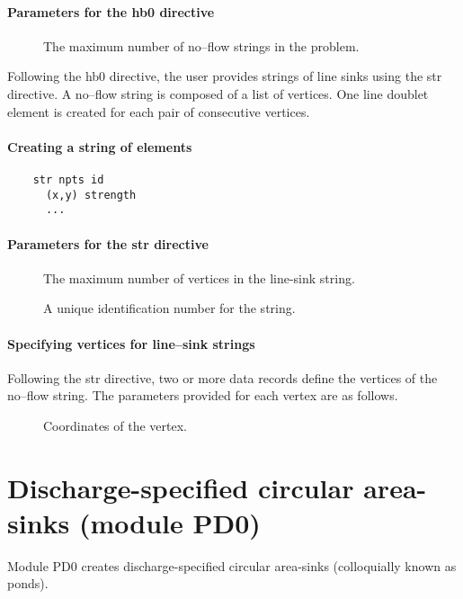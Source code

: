 \paragraph{Parameters for the \textsf{hb0} directive}
\begin{description}
\item [] The maximum number of no--flow strings in the
problem. \units{-}
\end{description}
Following the \textsf{hb0} directive, the user provides strings
of line sinks using the \textsf{str} directive. A no--flow string
is composed of a list of vertices. One line doublet element is created
for each pair of consecutive vertices.

\paragraph{Creating a string of elements}
\begin{verbatim}
    str npts id
      (x,y) strength
      ...
\end{verbatim}

\paragraph{Parameters for the str directive }
\begin{description}
  \item [] The maximum number of vertices in the line-sink
    string. \units{-}
  \item [] A unique identification number for the string. 
    \units{-}
\end{description}

\paragraph{Specifying vertices for line--sink strings}
Following the \textsf{str} directive, two or more data records define
the vertices of the no--flow string. The parameters provided for each
vertex are as follows.
\begin{description}
  \item [] Coordinates of the vertex. 
\end{description}

\section{Discharge-specified circular area-sinks (module PD0)\label{sec:pd0-module}}
Module PD0 creates discharge-specified circular area-sinks (colloquially
known as ponds). 

